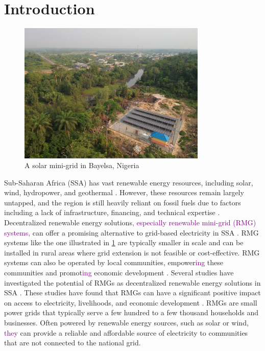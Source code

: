 \section{Introduction}
\label{sec:intro}
\begin{figure}[th]
	\centering
	\includegraphics[width=0.8\textwidth]{images/mini-grid-bayelsa.jpg}
	\caption{A solar mini-grid in Bayelsa, Nigeria}
	\label{fig:mini-grid}
\end{figure}

Sub-Saharan Africa (SSA) has vast renewable energy resources, including solar, wind, hydropower, and geothermal \cite{hafner2018prospects}. However, these resources remain largely untapped, and the region is still heavily reliant on fossil fuels due to factors including a lack of infrastructure, financing, and technical expertise \cite{irena2022renewable}. Decentralized renewable energy solutions\textcolor{purple}{, especially renewable mini-grid (RMG) systems,} can offer a promising alternative to grid-based electricity in SSA \cite{moro2018ensuring, rasagam2018delivering}. RMG systems like the one illustrated in \cref{fig:mini-grid} are typically smaller in scale and can be installed in rural areas where grid extension is not feasible or cost-effective. RMG systems can also be operated by local communities, empower\textcolor{purple}{ing} these communities and promot\textcolor{purple}{ing} economic development \cite{deshmukh2009role, edwards2018role}.
Several studies have investigated the potential of RMGs as decentralized renewable energy solutions in SSA \cite{rabetanetiarimanana2018pv, okunlola2018assessment, moner2018electrification}. These studies have found that RMGs can have a significant positive impact on access to electricity, livelihoods, and economic development \cite{dawoud2018hybrid}. RMGs are small power grids that typically serve a few hundred to a few thousand households and businesses. Often powered by renewable energy sources, such as solar or wind, \textcolor{purple}{they} can provide a reliable and affordable source of electricity to communities that are not connected to the national grid.

